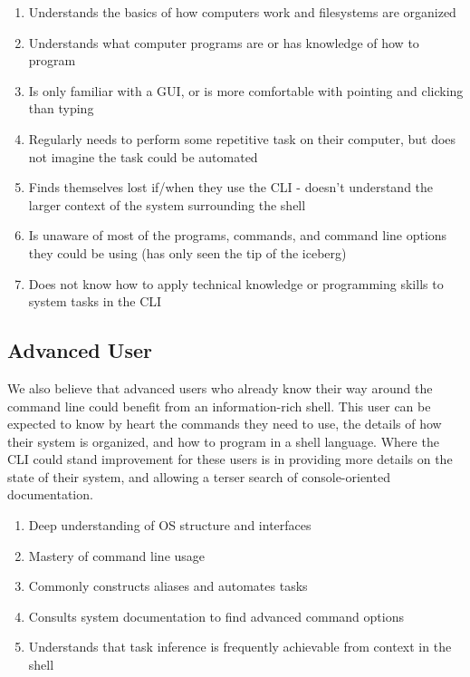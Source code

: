\begin{enumerate}
  \item Understands the basics of how computers work and filesystems are organized
  \item Understands what computer programs are or has knowledge of how to program
  \item Is only familiar with a GUI, or is more comfortable with pointing and clicking than typing
  \item Regularly needs to perform some repetitive task on their computer, but does not imagine the task could be automated
  \item Finds themselves lost if/when they use the CLI - doesn’t understand the larger context of the system surrounding the shell
  \item Is unaware of most of the programs, commands, and command line options they could be using (has only seen the tip of the iceberg)
  \item Does not know how to apply technical knowledge or programming skills to system tasks in the CLI
\end{enumerate}
\subsection{Advanced User}
We also believe that advanced users who already know their way around the
command line could benefit from an information-rich shell. This user can be
expected to know by heart the commands they need to use, the details of how
their system is organized, and how to program in a shell language. Where the CLI
could stand improvement for these users is in providing more details on the
state of their system, and allowing a terser search of console-oriented
documentation.

\begin{enumerate}
  \item Deep understanding of OS structure and interfaces
  \item Mastery of command line usage
  \item Commonly constructs aliases and automates tasks
  \item Consults system documentation to find advanced command options
  \item Understands that task inference is frequently achievable from context in the shell
\end{enumerate}

